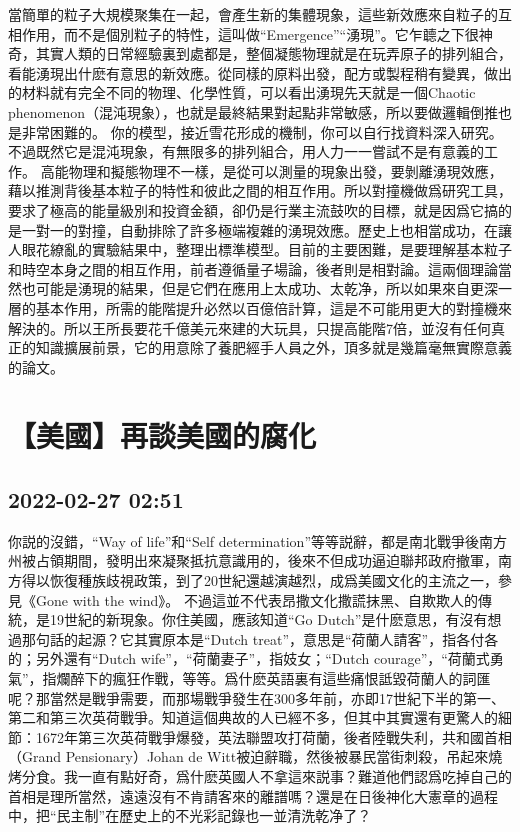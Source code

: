 \documentclass[twocolumn]{ctexart}
\begin{document}
當簡單的粒子大規模聚集在一起，會產生新的集體現象，這些新效應來自粒子的互相作用，而不是個別粒子的特性，這叫做“Emergence”“湧現”。它乍聼之下很神奇，其實人類的日常經驗裏到處都是，整個凝態物理就是在玩弄原子的排列組合，看能湧現出什麽有意思的新效應。從同樣的原料出發，配方或製程稍有變異，做出的材料就有完全不同的物理、化學性質，可以看出湧現先天就是一個Chaotic phenomenon（混沌現象），也就是最終結果對起點非常敏感，所以要做邏輯倒推也是非常困難的。
你的模型，接近雪花形成的機制，你可以自行找資料深入研究。不過既然它是混沌現象，有無限多的排列組合，用人力一一嘗試不是有意義的工作。
高能物理和擬態物理不一樣，是從可以測量的現象出發，要剝離湧現效應，藉以推測背後基本粒子的特性和彼此之間的相互作用。所以對撞機做爲研究工具，要求了極高的能量級別和投資金額，卻仍是行業主流鼓吹的目標，就是因爲它搞的是一對一的對撞，自動排除了許多極端複雜的湧現效應。歷史上也相當成功，在讓人眼花繚亂的實驗結果中，整理出標準模型。目前的主要困難，是要理解基本粒子和時空本身之間的相互作用，前者遵循量子場論，後者則是相對論。這兩個理論當然也可能是湧現的結果，但是它們在應用上太成功、太乾净，所以如果來自更深一層的基本作用，所需的能階提升必然以百億倍計算，這是不可能用更大的對撞機來解決的。所以王所長要花千億美元來建的大玩具，只提高能階7倍，並沒有任何真正的知識擴展前景，它的用意除了養肥經手人員之外，頂多就是幾篇毫無實際意義的論文。
\section*{【美國】再談美國的腐化}
\subsection*{2022-02-27 02:51}

你説的沒錯，“Way of life”和“Self determination”等等説辭，都是南北戰爭後南方州被占領期間，發明出來凝聚抵抗意識用的，後來不但成功逼迫聯邦政府撤軍，南方得以恢復種族歧視政策，到了20世紀還越演越烈，成爲美國文化的主流之一，參見《Gone with the wind》。
不過這並不代表昂撒文化撒謊抹黑、自欺欺人的傳統，是19世紀的新現象。你住美國，應該知道“Go Dutch”是什麽意思，有沒有想過那句話的起源？它其實原本是“Dutch treat”，意思是“荷蘭人請客”，指各付各的；另外還有“Dutch wife”，“荷蘭妻子”，指妓女；“Dutch courage”，“荷蘭式勇氣”，指爛醉下的瘋狂作戰，等等。爲什麽英語裏有這些痛恨詆毀荷蘭人的詞匯呢？那當然是戰爭需要，而那場戰爭發生在300多年前，亦即17世紀下半的第一、第二和第三次英荷戰爭。知道這個典故的人已經不多，但其中其實還有更驚人的細節：1672年第三次英荷戰爭爆發，英法聯盟攻打荷蘭，後者陸戰失利，共和國首相（Grand Pensionary）Johan de Witt被迫辭職，然後被暴民當街刺殺，吊起來燒烤分食。我一直有點好奇，爲什麽英國人不拿這來説事？難道他們認爲吃掉自己的首相是理所當然，遠遠沒有不肯請客來的離譜嗎？還是在日後神化大憲章的過程中，把“民主制”在歷史上的不光彩記錄也一並清洗乾净了？
\end{document}
